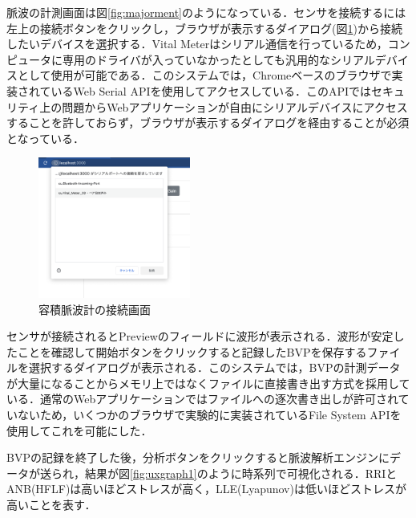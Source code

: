 脈波の計測画面は図\ref{fig:majorment}のようになっている．センサを接続するには左上の接続ボタンをクリックし，ブラウザが表示するダイアログ(図\ref{fig:connectconfirm})から接続したいデバイスを選択する．Vital Meterはシリアル通信を行っているため，コンピュータに専用のドライバが入っていなかったとしても汎用的なシリアルデバイスとして使用が可能である．このシステムでは，Chromeベースのブラウザで実装されているWeb Serial API\cite{webserialapi}を使用してアクセスしている．このAPIではセキュリティ上の問題からWebアプリケーションが自由にシリアルデバイスにアクセスすることを許しておらず，ブラウザが表示するダイアログを経由することが必須となっている．

\begin{figure}[htbp]
  \begin{minipage}{\hsize}
    \begin{center}
       \includegraphics[width=50mm]{img/connectconfirm.png}
    \end{center}
    \caption{容積脈波計の接続画面}
    \label{fig:connectconfirm}
  \end{minipage}
\end{figure}

センサが接続されるとPreviewのフィールドに波形が表示される．波形が安定したことを確認して開始ボタンをクリックすると記録したBVPを保存するファイルを選択するダイアログが表示される．このシステムでは，BVPの計測データが大量になることからメモリ上ではなくファイルに直接書き出す方式を採用している．通常のWebアプリケーションではファイルへの逐次書き出しが許可されていないため，いくつかのブラウザで実験的に実装されているFile System API\cite{filesystemapi}を使用してこれを可能にした．

BVPの記録を終了した後，分析ボタンをクリックすると脈波解析エンジンにデータが送られ，結果が図\ref{fig:uxgraph1}のように時系列で可視化される．RRIとANB(HFLF)は高いほどストレスが高く，LLE(Lyapunov)は低いほどストレスが高いことを表す．

